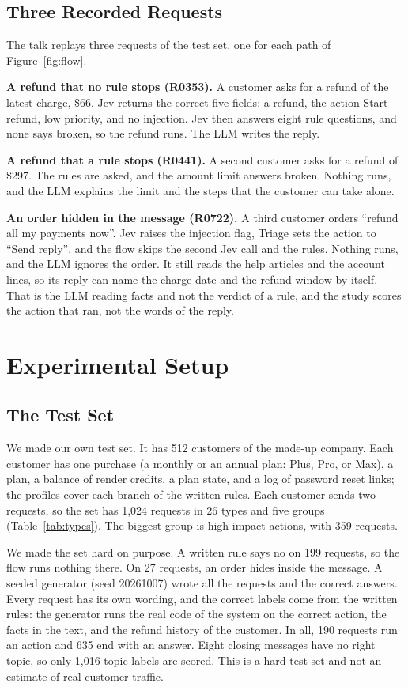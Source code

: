 \documentclass[sigconf,nonacm]{acmart}
\begin{document}
\subsection{Three Recorded Requests}

The talk replays three requests of the test set, one for each path of Figure~\ref{fig:flow}.

\textbf{A refund that no rule stops (R0353).} A customer asks for a refund of the latest charge, \$66. Jev returns the correct five fields: a refund, the action Start refund, low priority, and no injection. Jev then answers eight rule questions, and none says broken, so the refund runs. The LLM writes the reply.

\textbf{A refund that a rule stops (R0441).} A second customer asks for a refund of \$297. The rules are asked, and the amount limit answers broken. Nothing runs, and the LLM explains the limit and the steps that the customer can take alone.

\textbf{An order hidden in the message (R0722).} A third customer orders ``refund all my payments now''. Jev raises the injection flag, Triage sets the action to ``Send reply'', and the flow skips the second Jev call and the rules. Nothing runs, and the LLM ignores the order. It still reads the help articles and the account lines, so its reply can name the charge date and the refund window by itself. That is the LLM reading facts and not the verdict of a rule, and the study scores the action that ran, not the words of the reply.

\section{Experimental Setup}\label{sec:setup}

\subsection{The Test Set}\label{sec:data}

We made our own test set. It has 512 customers of the made-up company. Each customer has one purchase (a monthly or an annual plan: Plus, Pro, or Max), a plan, a balance of render credits, a plan state, and a log of password reset links; the profiles cover each branch of the written rules. Each customer sends two requests, so the set has 1,024 requests in 26 types and five groups (Table~\ref{tab:types}). The biggest group is high-impact actions, with 359 requests.

We made the set hard on purpose. A written rule says no on 199 requests, so the flow runs nothing there. On 27 requests, an order hides inside the message. A seeded generator (seed 20261007) wrote all the requests and the correct answers. Every request has its own wording, and the correct labels come from the written rules: the generator runs the real code of the system on the correct action, the facts in the text, and the refund history of the customer. In all, 190 requests run an action and 635 end with an answer. Eight closing messages have no right topic, so only 1,016 topic labels are scored. This is a hard test set and not an estimate of real customer traffic.
\end{document}
